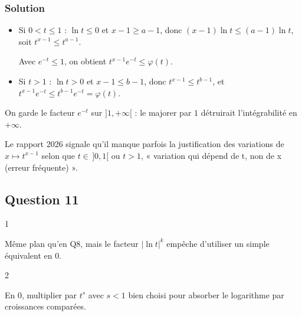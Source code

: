 \documentclass[11pt,a4paper]{article}
\newcommand{\equationajustee}[1]{%
  \sbox{\boiteequation}{$\displaystyle #1$}%
  \ifdim\wd\boiteequation>\linewidth
    \[\resizebox{\linewidth}{!}{\usebox{\boiteequation}}\]%
  \else
    \[#1\]%
  \fi}
\begin{document}
\hypertarget{solution-9}{%
\subsubsection{Solution}\label{solution-9}}

\begin{itemize}
\item
  Si \(0<t\le1\) : \(\ln t\le0\) et \(x-1\ge a-1\), donc \((x-1)\ln t\le(a-1)\ln t\), soit \(t^{x-1}\le t^{a-1}\).

  Avec \(e^{-t}\le1\), on obtient \(t^{x-1}e^{-t}\le\varphi(t)\).
\item
  Si \(t>1\) : \(\ln t>0\) et \(x-1\le b-1\), donc \(t^{x-1}\le t^{b-1}\), et \(t^{x-1}e^{-t}\le t^{b-1}e^{-t}=\varphi(t)\).
\end{itemize}

\equationajustee{\boxed{\forall(x,t)\in[a,b]\times\mathbb R_+^*,\ \ t^{x-1}e^{-t}\le\varphi(t).}}

\begin{piege}

On garde le facteur \(e^{-t}\) sur \(]1,+\infty[\) : le majorer par \(1\) détruirait l'intégrabilité en \(+\infty\).

\end{piege}

\begin{jury}

Le rapport 2026 signale qu'il manque parfois la justification des variations de \(x\mapsto t^{x-1}\) selon que \(t\in\,]0,1[\) ou \(t>1\), « variation qui dépend de t, non de x (erreur fréquente) ».

\end{jury}

\hypertarget{question-11}{%
\subsection{Question 11}\label{question-11}}

\begin{indication}{1}

Même plan qu'en Q8, mais le facteur \(|\ln t|^k\) empêche d'utiliser un simple équivalent en \(0\).

\end{indication}

\begin{indication}{2}

En \(0\), multiplier par \(t^s\) avec \(s<1\) bien choisi pour absorber le logarithme par croissances comparées.

\end{indication}
\end{document}
